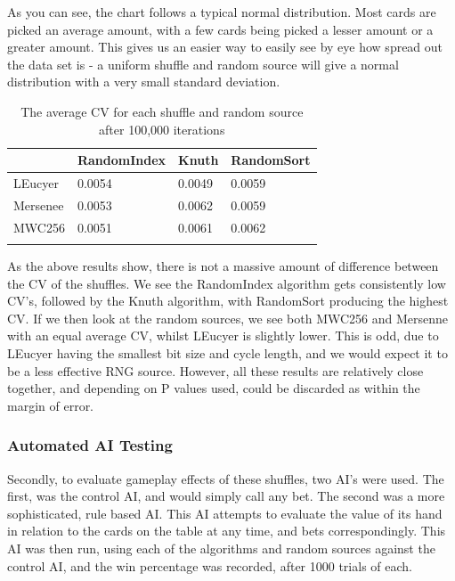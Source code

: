 As you can see, the chart follows a typical normal distribution. Most cards are
picked an average amount, with a few cards being picked a lesser amount or
a greater amount. This gives us an easier way to easily see by eye how spread
out the data set is - a uniform shuffle and random source will give a normal
distribution with a very small standard deviation.

\begin{table}[H]
    \centering
    \begin{tabular}{l l l l}
    \toprule
                & RandomIndex   & Knuth & RandomSort  \\
    \midrule
    LEucyer     & 0.0054        & 0.0049& 0.0059      \\ \addlinespace
    Mersenee    & 0.0053        & 0.0062& 0.0059      \\ \addlinespace
    MWC256      & 0.0051        & 0.0061& 0.0062      \\ \addlinespace
    \bottomrule
    \end{tabular}
    \caption{The average CV for each shuffle and random source after 100,000
             iterations}
\end{table}

As the above results show, there is not a massive amount of difference between
the CV of the shuffles. We see the RandomIndex algorithm gets consistently low
CV's, followed by the Knuth algorithm, with RandomSort producing the highest
CV\@. If we then look at the random sources, we see both MWC256 and Mersenne
with an equal average CV, whilst LEucyer is slightly lower. This is odd, due
to LEucyer having the smallest bit size and cycle length, and we would expect
it to be a less effective RNG source. However, all these results are relatively
close together, and depending on P values used, could be discarded as within
the margin of error.

\subsubsection{Automated AI Testing}

Secondly, to evaluate gameplay effects of these shuffles, two AI's were used.
The first, was the control AI, and would simply call any bet. The second
was a more sophisticated, rule based AI\@. This AI attempts to evaluate the value
of its hand in relation to the cards on the table at any time, and bets
correspondingly. This AI was then run, using each of the algorithms and
random sources against the control AI, and the win percentage was recorded,
after 1000 trials of each.

